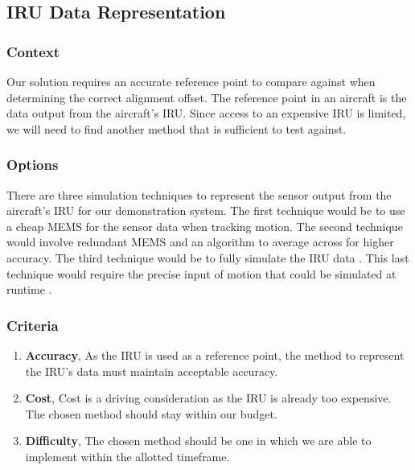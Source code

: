 \subsection{IRU Data Representation}
\subsubsection{Context}
Our solution requires an accurate reference point to compare against when determining the correct alignment offset.
The reference point in an aircraft is the data output from the aircraft’s IRU.
Since access to an expensive IRU is limited, we will need to find another method that is sufficient to test against. \\

\subsubsection{Options}
There are three simulation techniques to represent the sensor output from the aircraft’s IRU for our demonstration system.
The first technique would be to use a cheap MEMS for the sensor data when tracking motion.
The second technique would involve redundant MEMS and an algorithm to average across for higher accuracy. The third technique would be to fully simulate the IRU data \cite{REDUNDANT}.
This last technique would require the precise input of motion that could be simulated at runtime \cite{NIST}. \\


\subsubsection{Criteria}
\begin{enumerate}
	\item \textbf{Accuracy}, As the IRU is used as a reference point, the method to represent the IRU's data must maintain acceptable accuracy.
	\item \textbf{Cost}, Cost is a driving consideration as the IRU is already too expensive. The chosen method should stay within our budget.
	\item \textbf{Difficulty}, The chosen method should be one in which we are able to implement within the allotted timeframe. \\
\end{enumerate}

\newpage

